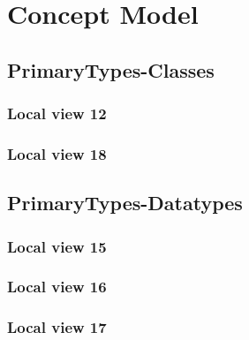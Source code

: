 
\chapter{Concept Model}
\label{chap:lu.uni.lassy.excalibur.group09.spec-CM}


\section{PrimaryTypes-Classes}
\subsection{Local view 12}
\label{sec:lu.uni.lassy.excalibur.group09.spec-CM-view-local-PrimaryTypes-Classes-12}

\subsection{Local view 18}
\label{sec:lu.uni.lassy.excalibur.group09.spec-CM-view-local-PrimaryTypes-Classes-18}




\section{PrimaryTypes-Datatypes}
\subsection{Local view 15}
\label{sec:lu.uni.lassy.excalibur.group09.spec-CM-view-local-PrimaryTypes-Datatypes-15}

\subsection{Local view 16}
\label{sec:lu.uni.lassy.excalibur.group09.spec-CM-view-local-PrimaryTypes-Datatypes-16}

\subsection{Local view 17}
\label{sec:lu.uni.lassy.excalibur.group09.spec-CM-view-local-PrimaryTypes-Datatypes-17}











